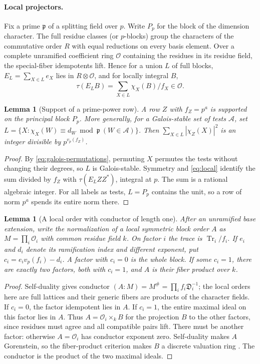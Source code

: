 \documentclass[11pt,a4paper]{article}
\numberwithin{equation}{section}
\newtheorem{lemma}[theorem]{Lemma}
\theoremstyle{remark}
\newcommand{\Tr}{\operatorname{Tr}}
\begin{document}
\paragraph{Local projectors.}
Fix a prime $\mathfrak p$ of a splitting field over $p$. Write $P_p$ for the block of the dimension character. The full residue classes (or $p$-blocks) group the characters of the commutative order $R$ with equal reductions on every basis element. Over a complete unramified coefficient ring $\mathcal O$ containing the residues in its residue field, the special-fiber idempotents lift. Hence for a union $L$ of full blocks, $E_L=\sum_{X\in L}e_X$ lies in $R\otimes\mathcal O$, and for locally integral $B$,
\begin{equation}\label{eq:local}
 \tau(E_LB)=\sum_{X\in L}\chi_X(B)/f_X\in\mathcal O .
\end{equation}

\begin{lemma}[Support of a prime-power row]\label{thm:principal-support}
A row $Z$ with $f_Z=p^a$ is supported on the principal block $P_p$.
More generally, for a Galois-stable set of tests $\mathcal A$, set
$L=\{X:\chi_X(W)\equiv d_W\bmod\mathfrak p\ (W\in\mathcal A)\}$.
Then $\sum_{X\in L}|\chi_Z(X)|^2$ is an integer divisible by $p^{v_p(f_Z)}$.
\end{lemma}\begin{proof}
By \eqref{eq:galois-permutations}, permuting $X$ permutes the tests without changing their degrees, so $L$ is Galois-stable. Symmetry and \eqref{eq:local} identify the sum divided by $f_Z$ with $\tau(E_LZZ^*)$, integral at $p$. The sum is a rational algebraic integer. For all labels as tests, $L=P_p$ contains the unit, so a row of norm $p^a$ spends its entire norm there.
\end{proof}

\begin{lemma}[A local order with conductor of length one]
After an unramified base extension, write the normalization of a local symmetric block order $A$ as $M=\prod_i\mathcal O_i$ with common residue field $k$. On factor $i$ the trace is $\Tr_i/f_i$. If $e_i$ and $d_i$ denote its ramification index and different exponent, put $c_i=e_iv_p(f_i)-d_i$. A factor with $c_i=0$ is the whole block. If some $c_i=1$, there are exactly two factors, both with $c_i=1$, and $A$ is their fiber product over $k$.
\end{lemma}\begin{proof}
Self-duality gives conductor $(A:M)=M^\#=\prod_i f_i\mathfrak D_i^{-1}$; the local orders here are full lattices and their generic fibers are products of the character fields. If $c_i=0$, the factor idempotent lies in $A$. If $c_i=1$, the entire maximal ideal on this factor lies in $A$. Thus $A=\mathcal O_i\times_k B$ for the projection $B$ to the other factors, since residues must agree and all compatible pairs lift. There must be another factor: otherwise $A=\mathcal O_i$ has conductor exponent zero. Self-duality makes $A$ Gorenstein, so the fiber-product criterion makes $B$ a discrete valuation ring \cite[Fact~2.6 and Corollary~2.7]{NSTV}. The conductor is the product of the two maximal ideals.
\end{proof}
\end{document}
